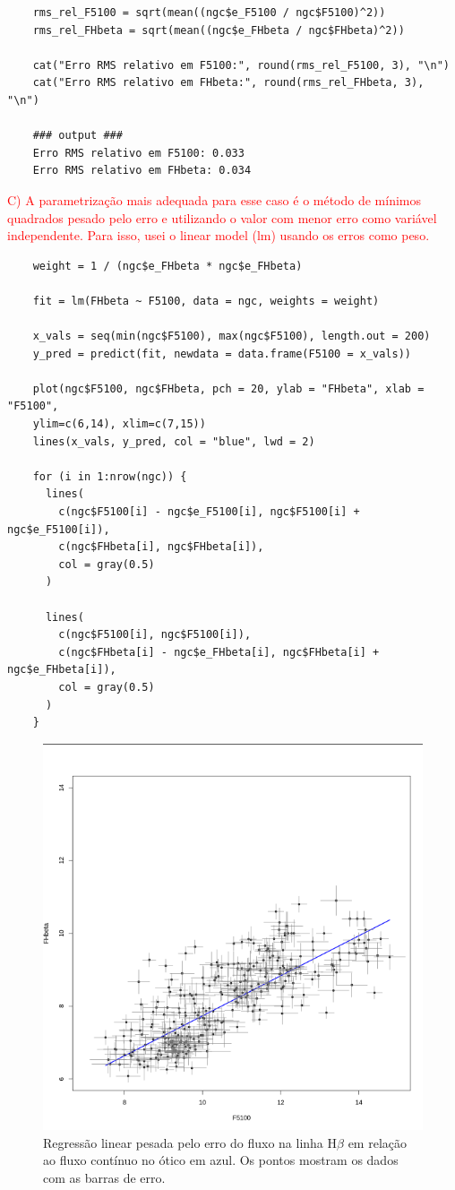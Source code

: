 \begin{lstlisting}
    rms_rel_F5100 = sqrt(mean((ngc$e_F5100 / ngc$F5100)^2))
    rms_rel_FHbeta = sqrt(mean((ngc$e_FHbeta / ngc$FHbeta)^2))
    
    cat("Erro RMS relativo em F5100:", round(rms_rel_F5100, 3), "\n")
    cat("Erro RMS relativo em FHbeta:", round(rms_rel_FHbeta, 3), "\n")

    ### output ###
    Erro RMS relativo em F5100: 0.033 
    Erro RMS relativo em FHbeta: 0.034 
\end{lstlisting}

\textcolor{red}{C) A parametrização mais adequada para esse caso é o método de mínimos quadrados pesado pelo erro e utilizando o valor com menor erro como variável independente. Para isso, usei o linear model (lm) usando os erros como peso.}

\begin{lstlisting}
    weight = 1 / (ngc$e_FHbeta * ngc$e_FHbeta)
    
    fit = lm(FHbeta ~ F5100, data = ngc, weights = weight)
    
    x_vals = seq(min(ngc$F5100), max(ngc$F5100), length.out = 200)
    y_pred = predict(fit, newdata = data.frame(F5100 = x_vals))
    
    plot(ngc$F5100, ngc$FHbeta, pch = 20, ylab = "FHbeta", xlab = "F5100",
    ylim=c(6,14), xlim=c(7,15))
    lines(x_vals, y_pred, col = "blue", lwd = 2)
    
    for (i in 1:nrow(ngc)) {
      lines(
        c(ngc$F5100[i] - ngc$e_F5100[i], ngc$F5100[i] + ngc$e_F5100[i]),
        c(ngc$FHbeta[i], ngc$FHbeta[i]),
        col = gray(0.5)
      )
      
      lines(
        c(ngc$F5100[i], ngc$F5100[i]),
        c(ngc$FHbeta[i] - ngc$e_FHbeta[i], ngc$FHbeta[i] + ngc$e_FHbeta[i]),
        col = gray(0.5)
      )
    }
\end{lstlisting}

\begin{figure}[h]
    \centering
    \includegraphics[width=0.6\linewidth]{Figuras/fit_b.png}
    \caption{Regressão linear pesada pelo erro do fluxo na linha H$\beta$ em relação ao fluxo contínuo no ótico em azul. Os pontos mostram os dados com as barras de erro.}
    \label{fit_b}
\end{figure}